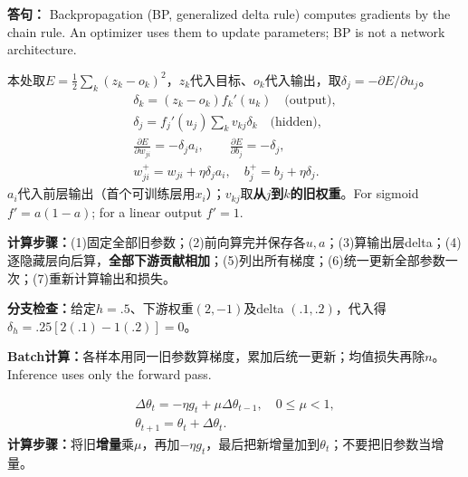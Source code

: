 \textbf{答句：} Backpropagation (BP, generalized delta rule) computes gradients by the chain rule. An optimizer uses them to update parameters; BP is not a network architecture.

本处取$E=\frac12\sum_k(z_k-o_k)^2$，$z_k$代入目标、$o_k$代入输出，取$\delta_j=-\partial E/\partial u_j$。
\[\begin{gathered}
\delta_k=(z_k-o_k)f_k'(u_k)\quad\text{(output)},\\
\delta_j=f_j'(u_j)\sum_kv_{kj}\delta_k\quad\text{(hidden)},\\
\frac{\partial E}{\partial w_{ji}}=-\delta_ja_i,\qquad
\frac{\partial E}{\partial b_j}=-\delta_j,\\
w_{ji}^+=w_{ji}+\eta\delta_ja_i,\quad b_j^+=b_j+\eta\delta_j.
\end{gathered}\]
$a_i$代入前层输出（首个可训练层用$x_i$）；$v_{kj}$取\textbf{从$j$到$k$的旧权重}。For sigmoid $f'=a(1-a)$; for a linear output $f'=1$.

\textbf{计算步骤：}(1)固定全部旧参数；(2)前向算完并保存各$u,a$；(3)算输出层delta；(4)逐隐藏层向后算，\textbf{全部下游贡献相加}；(5)列出所有梯度；(6)统一更新全部参数一次；(7)重新计算输出和损失。

\textbf{分支检查：}给定$h=.5$、下游权重$(2,-1)$及delta $(.1,.2)$，代入得$\delta_h=.25[2(.1)-1(.2)]=0$。

\textbf{Batch计算：}各样本用同一旧参数算梯度，累加后统一更新；均值损失再除$n$。Inference uses only the forward pass.

\[\begin{gathered}
\Delta\theta_t=-\eta g_t+\mu\Delta\theta_{t-1},\quad0\le\mu<1,\\
\theta_{t+1}=\theta_t+\Delta\theta_t.
\end{gathered}\]
\textbf{计算步骤：}将旧\textbf{增量}乘$\mu$，再加$-\eta g_t$，最后把新增量加到$\theta_t$；不要把旧参数当增量。

